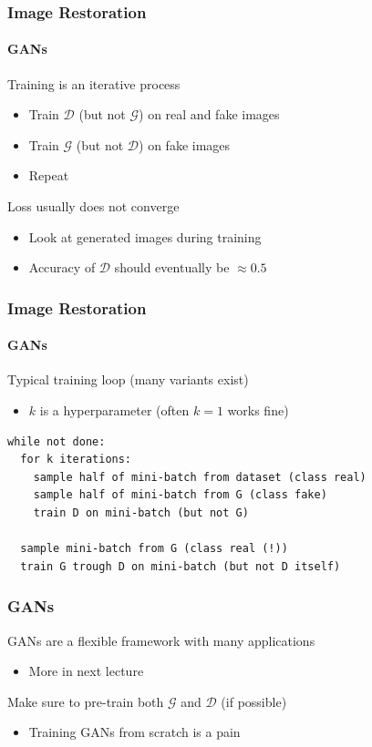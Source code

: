 \documentclass[xetex,professionalfont]{beamer}
\newcommand{\cD}{\mathcal{D}}
\newcommand{\cG}{\mathcal{G}}
\begin{document}
\begin{frame}
	\frametitle{Image Restoration}
	\framesubtitle{GANs}

	Training is an iterative process
	\begin{itemize}
		\item Train $\cD$ (but not $\cG$) on real and fake images
		\item Train $\cG$ (but not $\cD$) on fake images
		\item Repeat
	\end{itemize}

	\bigskip

	Loss usually does not converge
	\begin{itemize}
		\item Look at generated images during training
		\item Accuracy of $\cD$ should eventually be $\approx0.5$
	\end{itemize}

\end{frame}


\begin{frame}[fragile]
	\frametitle{Image Restoration}
	\framesubtitle{GANs}

	Typical training loop (many variants exist)
	\begin{itemize}
		\item $k$ is a hyperparameter (often $k=1$ works fine)
	\end{itemize}

	\medskip

	\begin{verbatim}
while not done:
  for k iterations:
    sample half of mini-batch from dataset (class real)
    sample half of mini-batch from G (class fake)
    train D on mini-batch (but not G)
  
  sample mini-batch from G (class real (!))
  train G trough D on mini-batch (but not D itself)
\end{verbatim}


\end{frame}

\begin{frame}
	\frametitle{GANs}

	GANs are a flexible framework with many applications
	\begin{itemize}
		\item More in next lecture
	\end{itemize}

	\bigskip
	Make sure to pre-train both $\cG$ and $\cD$ (if possible)
	\begin{itemize}
		\item Training GANs from scratch is a pain
	\end{itemize}
\end{frame}
\end{document}
